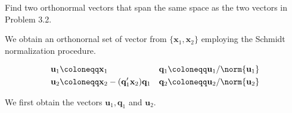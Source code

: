 \item [3.3] Find two orthonormal vectors that span
the same space as the two vectors in Problem 3.2.

We obtain an orthonornal set of vector from
$\{\mathbf{x}_1, \mathbf{x}_2\}$ employing the
Schmidt normalization procedure.

\begin{align*}
 \mathbf{u}_1 & \coloneqq \mathbf{x}_1  & \mathbf{q}_1 \coloneqq \mathbf{u}_1 / \norm{\mathbf{u}_1}\\
 \mathbf{u}_2 & \coloneqq \mathbf{x}_2 - (\mathbf{q}_1'\mathbf{x}_2)\mathbf{q}_1 & \mathbf{q}_2 \coloneqq \mathbf{u}_2 / \norm{\mathbf{u}_2}\\
\end{align*}

We first obtain the vectors $\mathbf{u}_1, \mathbf{q}_1$ and $\mathbf{u}_2$.

